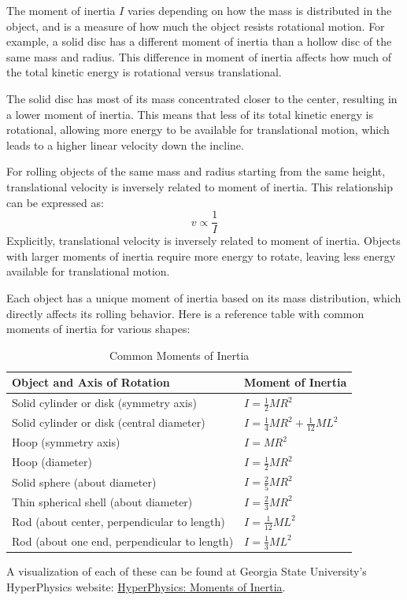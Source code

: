 The moment of inertia $I$ varies depending on how the mass is distributed in the object, and is a measure of how much the object resists rotational motion. For example, a solid disc has a different moment of inertia than a hollow disc of the same mass and radius. This difference in moment of inertia affects how much of the total kinetic energy is rotational versus translational.

The solid disc has most of its mass concentrated closer to the center, resulting in a lower moment of inertia. This means that less of its total kinetic energy is rotational, allowing more energy to be available for translational motion, which leads to a higher linear velocity down the incline.

\begin{mdframed}[frametitle = {Relationship between translational velocity and moment}, style = important]
For rolling objects of the same mass and radius starting from the same height, translational velocity is inversely related to moment of inertia. This relationship can be expressed as:
\begin{equation}
v \propto \frac{1}{I}
\end{equation}
Explicitly, translational velocity is inversely related to moment of inertia. Objects with larger moments of inertia require more energy to rotate, leaving less energy available for translational motion.
\end{mdframed}

Each object has a unique moment of inertia based on its mass distribution, which directly affects its rolling behavior. Here is a reference table with common moments of inertia for various shapes:
\begin{table}[H]
  \centering
  \renewcommand{\arraystretch}{1.5}
  \begin{tabular}{|l|l|}
    \hline
    \textbf{Object and Axis of Rotation} & \textbf{Moment of Inertia} \\
    \hline
    Solid cylinder or disk (symmetry axis) & $I = \tfrac{1}{2}MR^2$ \\
    \hline
    Solid cylinder or disk (central diameter) & $I = \tfrac{1}{4}MR^2 + \tfrac{1}{12}ML^2$ \\
    \hline
    Hoop (symmetry axis) & $I = MR^2$ \\
    \hline
    Hoop (diameter) & $I = \tfrac{1}{2}MR^2$ \\
    \hline
    Solid sphere (about diameter) & $I = \tfrac{2}{5}MR^2$ \\
    \hline
    Thin spherical shell (about diameter) & $I = \tfrac{2}{3}MR^2$ \\
    \hline
    Rod (about center, perpendicular to length) & $I = \tfrac{1}{12}ML^2$ \\
    \hline
    Rod (about one end, perpendicular to length) & $I = \tfrac{1}{3}ML^2$ \\
    \hline
  \end{tabular}
  \caption{Common Moments of Inertia}
  \label{tab:moments_of_inertia}
\end{table}
A visualization of each of these can be found at Georgia State University's HyperPhysics website: \href{http://hyperphysics.phy-astr.gsu.edu/hbase/mi.html#cmi}{HyperPhysics: Moments of Inertia}.

